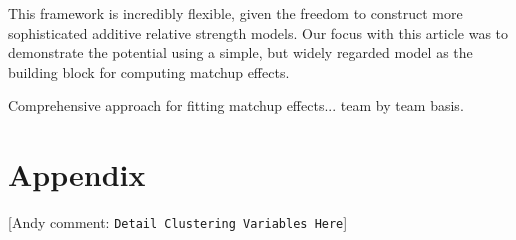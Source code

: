 \documentclass[letterpaper,12pt]{article}
\newcommand{\andyc}[1]{[{\color{red}\sc Andy comment: {\tt #1}}]}
\begin{document}
This framework is incredibly flexible, given the freedom to construct more sophisticated additive relative strength models. Our focus with this article was to demonstrate the potential using a simple, but widely regarded model as the building block for computing matchup effects.


Comprehensive approach for fitting matchup effects... team by team basis.


\section*{Appendix}
\andyc{Detail Clustering Variables Here}








\end{document}
